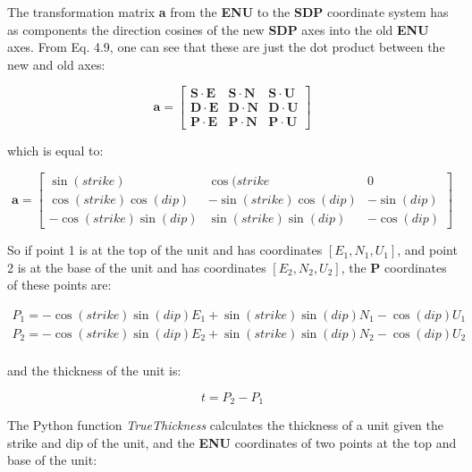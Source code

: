 \documentclass[a4paper , 12pt]{book}
\begin{document}
The transformation matrix \textbf{a} from the \textbf{ENU} to the \textbf{SDP} coordinate system has as components the direction cosines of the new \textbf{SDP} axes into the old \textbf{ENU} axes. From Eq. 4.9, one can see that these are just the dot product between the new and old axes:

\begin{equation*}
    \textbf{a}=
    \begin{bmatrix}
    \mathbf{S}\cdot\mathbf{E} & \mathbf{S}\cdot\mathbf{N} & \mathbf{S}\cdot\mathbf{U} \\
    \mathbf{D}\cdot\mathbf{E} & \mathbf{D}\cdot\mathbf{N} & \mathbf{D}\cdot\mathbf{U} \\
    \mathbf{P}\cdot\mathbf{E} & \mathbf{P}\cdot\mathbf{N} & \mathbf{P}\cdot\mathbf{U}
\end{bmatrix}
\end{equation*}

which is equal to:

\begin{equation}
    \textbf{a}=
    \begin{bmatrix}
    \sin(strike) & \cos(strike & 0 \\
    \cos(strike)\cos(dip) & -\sin(strike)\cos(dip) & -\sin(dip) \\
    -\cos(strike)\sin(dip) & \sin(strike)\sin(dip) & -\cos(dip)
\end{bmatrix}
\end{equation}

So if point 1 is at the top of the unit and has coordinates $[E_1,N_1,U_1]$, and point 2 is at the base of the unit and has coordinates $[E_2,N_2,U_2]$, the \textbf{P} coordinates of these points are:

\begin{equation}
    \begin{split}
        P_1 = -\cos(strike)\sin(dip)E_1+\sin(strike)\sin(dip)N_1-\cos(dip)U_1  \\
        P_2 = -\cos(strike)\sin(dip)E_2+\sin(strike)\sin(dip)N_2-\cos(dip)U_2  \\
    \end{split}
\end{equation}

and the thickness of the unit is:

\begin{equation}
    t = P_2-P_1
\end{equation}{}

The Python function \textit{TrueThickness} calculates the thickness of a unit given the strike and dip of the unit, and the \textbf{ENU} coordinates of two points at the top and base of the unit:
\end{document}
